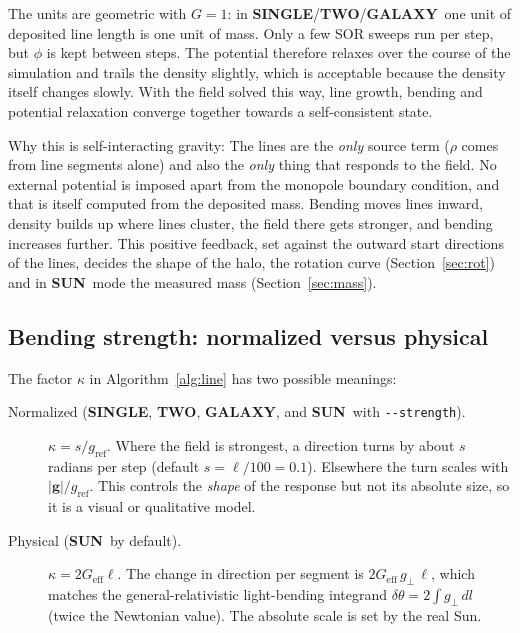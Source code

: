 \documentclass[12pt]{article}
\newcommand{\GALAXY}{\textcolor{galaxyc}{\textbf{\textsf{GALAXY}}}}
\newcommand{\SUN}{\textcolor{sunc}{\textbf{\textsf{SUN}}}}
\newcommand{\SINGLE}{\textbf{\textsf{SINGLE}}}
\newcommand{\TWO}{\textbf{\textsf{TWO}}}
\newcommand{\opt}[1]{\texttt{-{}-#1}}
\newcommand{\vect}[1]{\mathbf{#1}}
\newcommand{\gperp}{g_{\perp}}
\begin{document}
The units are geometric with $G=1$: in \SINGLE/\TWO/\GALAXY\ one unit of
deposited line length is one unit of mass. Only a few SOR sweeps run per step,
but $\phi$ is kept between steps. The potential therefore relaxes over the course of
the simulation and trails the density slightly, which is acceptable because
the density itself changes slowly. With the field solved this way, line growth,
bending and potential relaxation converge together towards a self-consistent
state.

\begin{corebox}{Why this is self-interacting gravity: }
The lines are the \emph{only} source term ($\rho$ comes from line segments alone)
and also the \emph{only} thing that responds to the field. No external potential
is imposed apart from the monopole boundary condition, and that is itself
computed from the deposited mass. Bending moves lines inward, density
builds up where lines cluster, the field there gets stronger, and bending
increases further. This positive feedback, set against the outward start
directions of the lines, decides the shape of the halo, the rotation curve
(Section~\ref{sec:rot}) and in \SUN\ mode the measured mass
(Section~\ref{sec:mass}).
\end{corebox}

\subsection{Bending strength: normalized versus physical}

The factor $\kappa$ in Algorithm~\ref{alg:line} has two possible meanings:
\begin{description}
  \item[Normalized (\SINGLE, \TWO, \GALAXY, and \SUN\ with \opt{strength}).]
     $\kappa = s/g_\text{ref}$. Where the field is strongest, a direction
     turns by about $s$ radians per step (default $s=\ell/100=0.1$). Elsewhere the turn
     scales with $|\vect g|/g_\text{ref}$. This controls the \emph{shape}
     of the response but not its absolute size, so it is a visual or qualitative model.
  \item[Physical (\SUN\ by default).] $\kappa=2G_\text{eff}\ell$. The change in
     direction per segment is $2G_\text{eff}\,\gperp\,\ell$, which matches the
     general-relativistic light-bending integrand $\delta\theta = 2\int\gperp\,dl$
     (twice the Newtonian value). The absolute scale is set by the real Sun.
\end{description}
\end{document}
